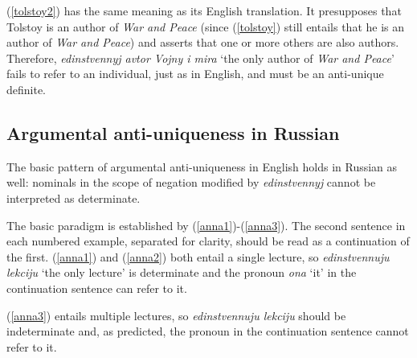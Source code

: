 (\ref{tolstoy2}) has the same meaning as its English translation. It presupposes that Tolstoy is an author of \textit{War and Peace} (since (\ref{tolstoy}) still entails that he is an author of \textit{War and Peace}) and asserts that one or more others are also authors. Therefore, \textit{edinstvennyj avtor Vojny i mira} `the only author of \textit{War and Peace}' fails to refer to an individual, just as in English, and must be an anti-unique definite.

\subsection{Argumental anti-uniqueness in Russian}
The basic pattern of argumental anti-uniqueness in English holds in Russian as well: nominals in the scope of negation modified by \textit{edinstvennyj} cannot be interpreted as determinate.

The basic paradigm is established by (\ref{anna1})-(\ref{anna3}). The second sentence in each numbered example, separated for clarity, should be read as a continuation of the first. (\ref{anna1}) and (\ref{anna2}) both entail a single lecture, so \textit{edinstvennuju lekciju} `the only lecture' is determinate and the pronoun \textit{ona} `it' in the continuation sentence can refer to it.

(\ref{anna3}) entails multiple lectures, so \textit{edinstvennuju lekciju} should be indeterminate and, as predicted, the pronoun in the continuation sentence cannot refer to it.

